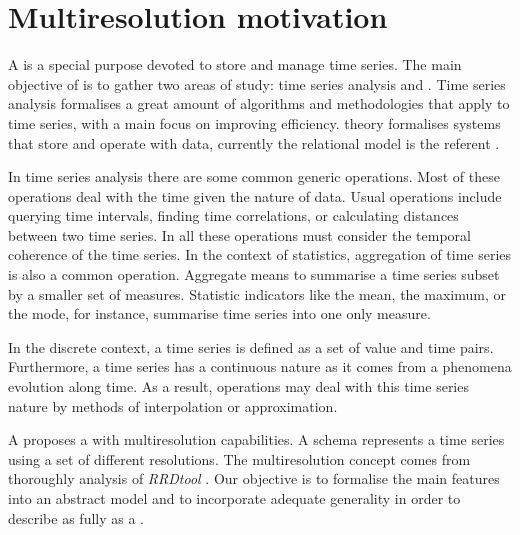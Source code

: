 \section{Multiresolution motivation}
\label{sec:features}

A  is a special purpose  devoted to store and
manage time series.  The main objective of  is to gather
two areas of study: time series analysis and .  Time series
analysis formalises a great amount of algorithms and methodologies
that apply to time series, with a main focus on improving
efficiency.  theory formalises systems that store and
operate with data, currently the relational model is the referent
\cite{date:introduction}.



In time series analysis there are some common generic operations.
Most of these operations deal with the time given the nature of data.
Usual operations include querying time intervals, finding time
correlations, or calculating distances between two time series. In
all these operations  must consider the temporal coherence
of the time series.  In the context of statistics, aggregation of time
series is also a common operation. Aggregate means to summarise a time
series subset by a smaller set of measures. Statistic indicators like
the mean, the maximum, or the mode, for instance, summarise time
series into one only measure.

In the discrete context, a time series is defined as a set of value
and time pairs. Furthermore, a time series has a continuous nature as
it comes from a phenomena evolution along time. As a result,
 operations may deal with this time series nature by
methods of interpolation or approximation.


A  proposes a  with multiresolution
capabilities.  A  schema represents a time series using a
set of different resolutions.  The multiresolution concept comes from
thoroughly analysis of \emph{RRDtool} \cite{rrdtool}.  Our objective
is to formalise the main features into an abstract model and to
incorporate adequate generality in order to describe  as
fully as a .



